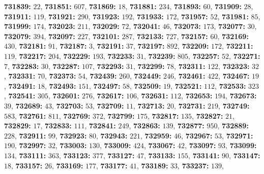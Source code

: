 \textsf{\bfseries 731839:} $22$, \textsf{\bfseries 731851:} $607$, \textsf{\bfseries 731869:} $18$, \textsf{\bfseries 731881:} $234$, \textsf{\bfseries 731893:} $60$, \textsf{\bfseries 731909:} $28$, \textsf{\bfseries 731911:} $119$, \textsf{\bfseries 731921:} $290$, \textsf{\bfseries 731923:} $192$, \textsf{\bfseries 731933:} $172$, \textsf{\bfseries 731957:} $52$, \textsf{\bfseries 731981:} $85$, \textsf{\bfseries 731999:} $174$, \textsf{\bfseries 732023:} $211$, \textsf{\bfseries 732029:} $72$, \textsf{\bfseries 732041:} $46$, \textsf{\bfseries 732073:} $173$, \textsf{\bfseries 732077:} $30$, \textsf{\bfseries 732079:} $394$, \textsf{\bfseries 732097:} $227$, \textsf{\bfseries 732101:} $287$, \textsf{\bfseries 732133:} $727$, \textsf{\bfseries 732157:} $60$, \textsf{\bfseries 732169:} $430$, \textsf{\bfseries 732181:} $91$, \textsf{\bfseries 732187:} $3$, \textsf{\bfseries 732191:} $37$, \textsf{\bfseries 732197:} $892$, \textsf{\bfseries 732209:} $172$, \textsf{\bfseries 732211:} $119$, \textsf{\bfseries 732217:} $204$, \textsf{\bfseries 732229:} $193$, \textsf{\bfseries 732233:} $31$, \textsf{\bfseries 732239:} $805$, \textsf{\bfseries 732257:} $52$, \textsf{\bfseries 732271:} $7$, \textsf{\bfseries 732283:} $30$, \textsf{\bfseries 732287:} $107$, \textsf{\bfseries 732293:} $31$, \textsf{\bfseries 732299:} $78$, \textsf{\bfseries 732311:} $122$, \textsf{\bfseries 732323:} $32$, \textsf{\bfseries 732331:} $70$, \textsf{\bfseries 732373:} $54$, \textsf{\bfseries 732439:} $260$, \textsf{\bfseries 732449:} $246$, \textsf{\bfseries 732461:} $422$, \textsf{\bfseries 732467:} $19$, \textsf{\bfseries 732491:} $18$, \textsf{\bfseries 732493:} $151$, \textsf{\bfseries 732497:} $58$, \textsf{\bfseries 732509:} $19$, \textsf{\bfseries 732521:} $112$, \textsf{\bfseries 732533:} $323$, \textsf{\bfseries 732541:} $305$, \textsf{\bfseries 732601:} $276$, \textsf{\bfseries 732617:} $106$, \textsf{\bfseries 732631:} $112$, \textsf{\bfseries 732653:} $194$, \textsf{\bfseries 732673:} $39$, \textsf{\bfseries 732689:} $43$, \textsf{\bfseries 732703:} $53$, \textsf{\bfseries 732709:} $11$, \textsf{\bfseries 732713:} $20$, \textsf{\bfseries 732731:} $219$, \textsf{\bfseries 732749:} $583$, \textsf{\bfseries 732761:} $811$, \textsf{\bfseries 732769:} $372$, \textsf{\bfseries 732799:} $175$, \textsf{\bfseries 732817:} $135$, \textsf{\bfseries 732827:} $21$, \textsf{\bfseries 732829:} $17$, \textsf{\bfseries 732833:} $111$, \textsf{\bfseries 732841:} $249$, \textsf{\bfseries 732863:} $139$, \textsf{\bfseries 732877:} $950$, \textsf{\bfseries 732889:} $228$, \textsf{\bfseries 732911:} $99$, \textsf{\bfseries 732923:} $80$, \textsf{\bfseries 732943:} $221$, \textsf{\bfseries 732959:} $46$, \textsf{\bfseries 732967:} $53$, \textsf{\bfseries 732971:} $190$, \textsf{\bfseries 732997:} $32$, \textsf{\bfseries 733003:} $130$, \textsf{\bfseries 733009:} $424$, \textsf{\bfseries 733067:} $42$, \textsf{\bfseries 733097:} $93$, \textsf{\bfseries 733099:} $134$, \textsf{\bfseries 733111:} $363$, \textsf{\bfseries 733123:} $377$, \textsf{\bfseries 733127:} $47$, \textsf{\bfseries 733133:} $155$, \textsf{\bfseries 733141:} $90$, \textsf{\bfseries 733147:} $18$, \textsf{\bfseries 733157:} $26$, \textsf{\bfseries 733169:} $177$, \textsf{\bfseries 733177:} $41$, \textsf{\bfseries 733189:} $33$, \textsf{\bfseries 733237:} $139$, 

